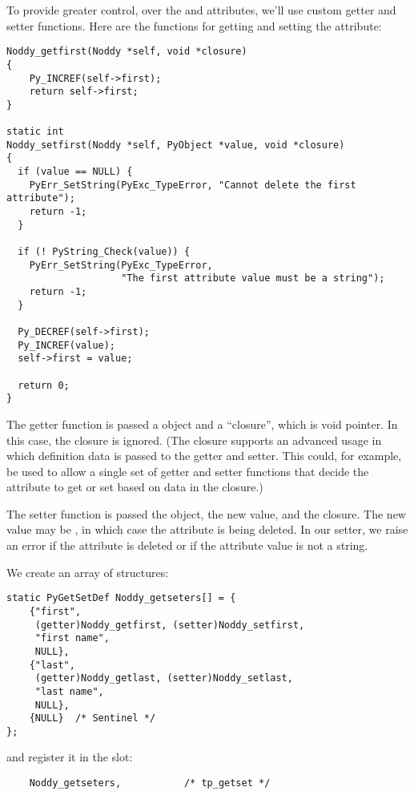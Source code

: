 

To provide greater control, over the  and 
attributes, we'll use custom getter and setter functions.  Here are
the functions for getting and setting the  attribute:

\begin{verbatim}
Noddy_getfirst(Noddy *self, void *closure)
{
    Py_INCREF(self->first);
    return self->first;
}

static int
Noddy_setfirst(Noddy *self, PyObject *value, void *closure)
{
  if (value == NULL) {
    PyErr_SetString(PyExc_TypeError, "Cannot delete the first attribute");
    return -1;
  }

  if (! PyString_Check(value)) {
    PyErr_SetString(PyExc_TypeError,
                    "The first attribute value must be a string");
    return -1;
  }

  Py_DECREF(self->first);
  Py_INCREF(value);
  self->first = value;

  return 0;
}
\end{verbatim}

The getter function is passed a  object and a
``closure'', which is void pointer. In this case, the closure is
ignored. (The closure supports an advanced usage in which definition
data is passed to the getter and setter. This could, for example, be
used to allow a single set of getter and setter functions that decide
the attribute to get or set based on data in the closure.)

The setter function is passed the  object, the new value,
and the closure. The new value may be \NULL, in which case the
attribute is being deleted.  In our setter, we raise an error if the
attribute is deleted or if the attribute value is not a string.

We create an array of  structures:

\begin{verbatim}
static PyGetSetDef Noddy_getseters[] = {
    {"first",
     (getter)Noddy_getfirst, (setter)Noddy_setfirst,
     "first name",
     NULL},
    {"last",
     (getter)Noddy_getlast, (setter)Noddy_setlast,
     "last name",
     NULL},
    {NULL}  /* Sentinel */
};
\end{verbatim}

and register it in the  slot:

\begin{verbatim}
    Noddy_getseters,           /* tp_getset */
\end{verbatim}

